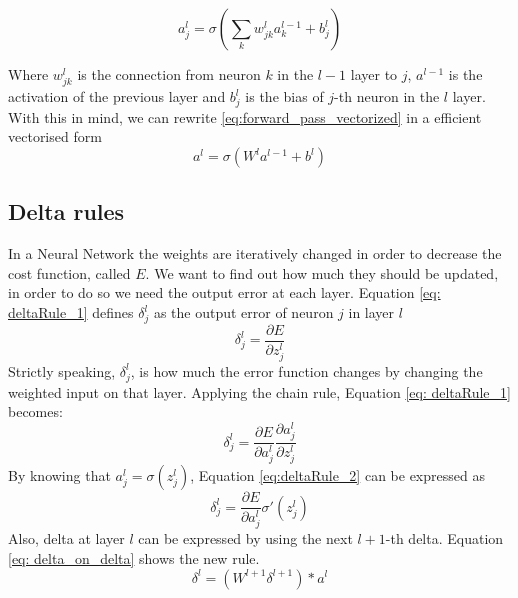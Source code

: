 \documentclass[11pt]{article}
\begin{document}
\begin{equation}
\label{eq:forward_pass}
a^l_j = \sigma(\sum_k w^l_{jk}a^{l-1}_k + b^l_j)
\end{equation}

Where $w^l_{jk}$ is the connection from neuron $k$ in the $l-1$ layer to $j$, $a^{l-1}$ is the activation of the previous layer and $b^l_j$ is the bias of $j$-th neuron in the $l$ layer. With this in mind, we can rewrite \ref{eq:forward_pass_vectorized} in a efficient vectorised form
\begin{equation}
\label{eq:forward_pass_vectorized}
a^l = \sigma(W^la^{l-1} + b^l)
\end{equation}

\subsection{Delta rules}
In a Neural Network the weights are iteratively changed in order to decrease the cost function, called $E$. We want to find out how much they should be updated, in order to do so we need the output error at each layer. Equation \ref{eq: deltaRule_1} defines $\delta^l_j$ as the output error of neuron $j$ in layer $l$
\begin{equation}
	\delta^l_j = \frac{\partial E}{\partial z^l_j}
	\label{eq: deltaRule_1}
\end{equation}
Strictly speaking, $\delta^l_j$, is how much the error function changes by changing the weighted input on that layer. Applying the chain rule, Equation \ref{eq: deltaRule_1} becomes:
\begin{equation}
\delta^l_j = \frac{\partial E}{\partial a^l_j} \frac{\partial a^l_j}{\partial z^l_j}
\label{eq:deltaRule_2}
\end{equation}
By knowing that $a^l_j = \sigma(z^l_j)$, Equation \ref{eq:deltaRule_2} can be expressed as
\begin{equation}
\delta^l_j = \frac{\partial E}{\partial a^l_j} \sigma'(z^l_j)
\label{eq:deltaRule}	
\end{equation}
Also, delta at layer $l$ can be expressed by using the next $l+1$-th delta. Equation \ref{eq: delta_on_delta} shows the new rule.
\begin{equation}
\delta^l = (W^{l+1}\delta^{l+1}) * a^l
\label{eq: delta_on_delta}
\end{equation}
\end{document}
